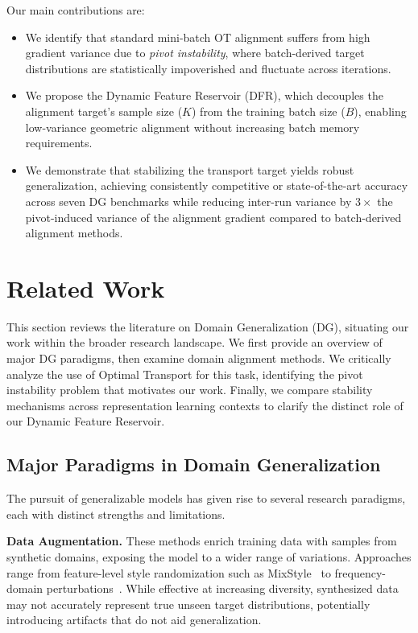 \documentclass[preprint,12pt]{elsarticle}
\providecommand{\DIFadd}[1]{{\protect\color{blue} \sf #1}} %
\providecommand{\DIFdel}[1]{{\protect\color{red} \scriptsize #1}} %
\providecommand{\DIFaddbegin}{} %
\providecommand{\DIFaddend}{} %
\providecommand{\DIFdelbegin}{} %
\providecommand{\DIFdelend}{} %
\newcommand{\DIFscaledelfig}{0.5}
\newlength{\DIFdelgraphicswidth} %
\newlength{\DIFdelgraphicsheight} %
\newcommand{\DIFaddincludegraphics}[2][]{{\color{blue}\fbox{\DIFOincludegraphics[#1]{#2}}}} %
\newcommand{\DIFdelincludegraphics}[2][]{%
\sbox{\DIFdelgraphicsbox}{\DIFOincludegraphics[#1]{#2}}%
\settoboxwidth{\DIFdelgraphicswidth}{\DIFdelgraphicsbox} %
\settoboxtotalheight{\DIFdelgraphicsheight}{\DIFdelgraphicsbox} %
\scalebox{\DIFscaledelfig}{%
\parbox[b]{\DIFdelgraphicswidth}{\usebox{\DIFdelgraphicsbox}\\[-\baselineskip] \rule{\DIFdelgraphicswidth}{0em}}\llap{\resizebox{\DIFdelgraphicswidth}{\DIFdelgraphicsheight}{%
\setlength{\unitlength}{\DIFdelgraphicswidth}%
\begin{picture}(1,1)%
\thicklines\linethickness{2pt} %
{\color[rgb]{1,0,0}\put(0,0){\framebox(1,1){}}}%
{\color[rgb]{1,0,0}\put(0,0){\line( 1,1){1}}}%
{\color[rgb]{1,0,0}\put(0,1){\line(1,-1){1}}}%
\end{picture}%
}\hspace*{3pt}}} %
} %
\DeclareRobustCommand{\DIFaddbegin}{\DIFOaddbegin \let\includegraphics\DIFaddincludegraphics} %
\DeclareRobustCommand{\DIFaddend}{\DIFOaddend \let\includegraphics\DIFOincludegraphics} %
\DeclareRobustCommand{\DIFdelbegin}{\DIFOdelbegin \let\includegraphics\DIFdelincludegraphics} %
\DeclareRobustCommand{\DIFdelend}{\DIFOaddend \let\includegraphics\DIFOincludegraphics} %
\begin{document}
Our main contributions are:
\begin{itemize}
    \item We identify that standard mini-batch OT alignment suffers from high gradient variance due to \textit{pivot instability}, where batch-derived target distributions are statistically impoverished and fluctuate across iterations.
    \item We propose the Dynamic Feature Reservoir (DFR), which decouples the alignment target's sample size ($K$) from the training batch size ($B$), enabling low-variance geometric alignment without increasing batch memory requirements.
    \item We demonstrate that stabilizing the transport target yields robust generalization, achieving consistently competitive or state-of-the-art accuracy across seven DG benchmarks while reducing \DIFdelbegin \DIFdel{inter-run variance by $3\times$ }\DIFdelend \DIFaddbegin \DIFadd{the pivot-induced variance of the alignment gradient }\DIFaddend compared to batch-derived alignment methods.
\end{itemize} \section{Related Work}
\label{sec:related_work}

This section reviews the literature on Domain Generalization (DG), situating our work within the broader research landscape. We first provide an overview of major DG paradigms, then examine domain alignment methods. We critically analyze the use of Optimal Transport for this task, identifying the pivot instability problem that motivates our work. Finally, we compare stability mechanisms across representation learning contexts to clarify the distinct role of our Dynamic Feature Reservoir.

\subsection{Major Paradigms in Domain Generalization}

The pursuit of generalizable models has given rise to several research paradigms, each with distinct strengths and limitations.

\textbf{Data Augmentation.} These methods enrich training data with samples from synthetic domains, exposing the model to a wider range of variations. Approaches range from feature-level style randomization such as MixStyle~\citep{zhou2021mixstyle} to frequency-domain perturbations~\citep{xu2021fourier}. While effective at increasing diversity, synthesized data may not accurately represent true unseen target distributions, potentially introducing artifacts that do not aid generalization.
\end{document}
